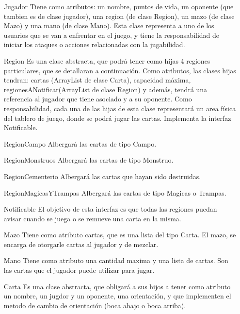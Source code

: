 \begin{itemize}

\item[Jugador] Tiene como atributos: un nombre, puntos de vida, un oponente (que tambien es de clase jugador), una region (de clase Region), un mazo (de clase Mazo) y una mano (de clase Mano). Esta clase representa a uno de los usuarios que se van a enfrentar en el juego, y tiene la responsabilidad de iniciar los ataques o acciones relacionadas con la jugabilidad.

\item[Region] Es una clase abstracta, que podrá tener como hijas 4 regiones particulares, que se detallaran a continuación. Como atributos, las clases hijas tendran: cartas (ArrayList de clase Carta), capacidad máxima, regionesANotificar(ArrayList de clase Region) y además, tendrá una referencia al jugador que tiene asociado y a su oponente. Como responsabilidad, cada una de las hijas de esta clase representará un area física del tablero de juego, donde se podrá jugar las cartas. Implementa la interfaz Notificable.

\item[RegionCampo] Albergará las cartas de tipo Campo.

\item[RegionMonstruos] Albergará las cartas de tipo Monstruo.

\item[RegionCementerio] Albergará las cartas que hayan sido destruidas.

\item[RegionMagicasYTrampas] Albergará las cartas de tipo Magicas o Trampas.

\item[Notificable] El objetivo de esta interfaz es que todas las regiones puedan avisar cuando se juega o se remueve una carta en la misma.

\item[Mazo] Tiene como atributo cartas, que es una lista del tipo Carta. El mazo, se encarga de otorgarle cartas al jugador y de mezclar.

\item[Mano] Tiene como atributo una cantidad maxima y una lista de cartas. Son las cartas que el jugador puede utilizar para jugar.

\item[Carta] Es una clase abstracta, que obligará a sus hijos a tener como atributo un nombre, un jugdor y un oponente, una orientación,  y que implementen el metodo de cambio de orientación (boca abajo o boca arriba).


\end{itemize}
